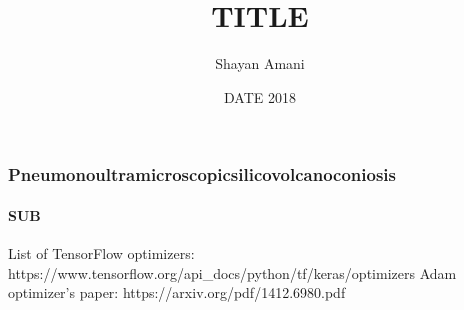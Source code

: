 \documentclass{beamer}
\title{TITLE}
\author{Shayan Amani}
\date{DATE 2018}
\institute{Department of Computer Science, University of New Hampshire}
\begin{document}
  \begin{frame}
    \titlepage
  \end{frame}

\begin{frame}
    \frametitle{Pneumonoultramicroscopicsilicovolcanoconiosis}
    \framesubtitle{SUB}
    
    List of TensorFlow optimizers: https://www.tensorflow.org/api_docs/python/tf/keras/optimizers
    Adam optimizer's paper: https://arxiv.org/pdf/1412.6980.pdf

  \end{frame}

\end{document}
